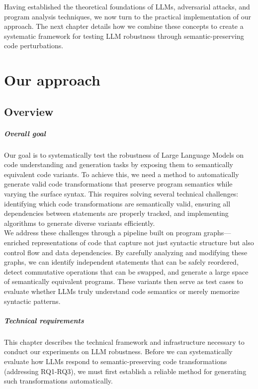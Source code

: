 \documentclass[%
thesis=student,%
coverpage=false,%
titlepage=false,%
headmarks=true, %
english,%
font=libertine, %
math=newpxtx, %
BCOR=5mm,%
coverBCOR=11mm%
]{tum-templates/book/tumbook}
\begin{document}
Having established the theoretical foundations of LLMs, adversarial attacks, and program analysis techniques, we now turn to the practical implementation of our approach. The next chapter details how we combine these concepts to create a systematic framework for testing LLM robustness through semantic-preserving code perturbations.

\chapter{Our approach}
\label{ch:Our_approach}
\section{Overview}

\paragraph{Overall goal}

Our goal is to systematically test the robustness of Large Language Models on code understanding and generation tasks by exposing them to semantically equivalent code variants. To achieve this, we need a method to automatically generate valid code transformations that preserve program semantics while varying the surface syntax. This requires solving several technical challenges: identifying which code transformations are semantically valid, ensuring all dependencies between statements are properly tracked, and implementing algorithms to generate diverse variants efficiently. \\

We address these challenges through a pipeline built on program graphs—enriched representations of code that capture not just syntactic structure but also control flow and data dependencies. By carefully analyzing and modifying these graphs, we can identify independent statements that can be safely reordered, detect commutative operations that can be swapped, and generate a large space of semantically equivalent programs. These variants then serve as test cases to evaluate whether LLMs truly understand code semantics or merely memorize syntactic patterns.

\paragraph{Technical requirements}

This chapter describes the technical framework and infrastructure necessary to conduct our experiments on LLM robustness. Before we can systematically evaluate how LLMs respond to semantic-preserving code transformations (addressing RQ1-RQ3), we must first establish a reliable method for generating such transformations automatically.
\end{document}
